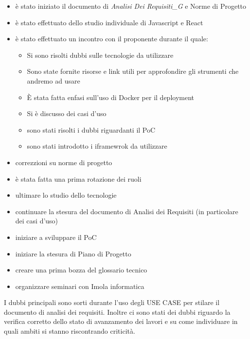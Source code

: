 \begin{itemize}
    \item è stato iniziato il documento di \textit{Analisi Dei Requisiti_G} e Norme di Progetto
    \item è stato effettuato dello studio individuale di Javascript e React
    \item è stato effettuato un incontro con il proponente durante il quale:
    \begin{itemize}
        \item Si sono risolti dubbi sulle tecnologie da utilizzare
        \item Sono state fornite risorse e link utili per approfondire gli strumenti che andremo ad usare
        \item È stata fatta enfasi sull'uso di Docker per il deployment
        \item Si è discusso dei casi d'uso
        \item sono stati risolti i dubbi riguardanti il PoC
        \item sono stati introdotto i iframewrok da utilizzare
    \end{itemize}
    \item correzzioni su norme di progetto
    \item è stata fatta una prima rotazione dei ruoli
\end{itemize}

\begin{itemize}
    \item ultimare lo studio dello tecnologie
    \item continuare la stesura del documento di Analisi dei Requisiti (in particolare dei casi d'uso)
    \item iniziare a sviluppare il PoC
    \item iniziare la stesura di Piano di Progetto
    \item creare una prima bozza del glossario tecnico
    \item organizzare seminari con Imola informatica
\end{itemize}


I dubbi principali sono sorti durante l'uso degli USE CASE per stilare il documento di analisi dei requisiti. Inoltre ci sono stati dei dubbi riguardo la verifica corretto dello stato di avanzamento dei lavori e su come individuare in quali ambiti si stanno riscontrando criticità. 

